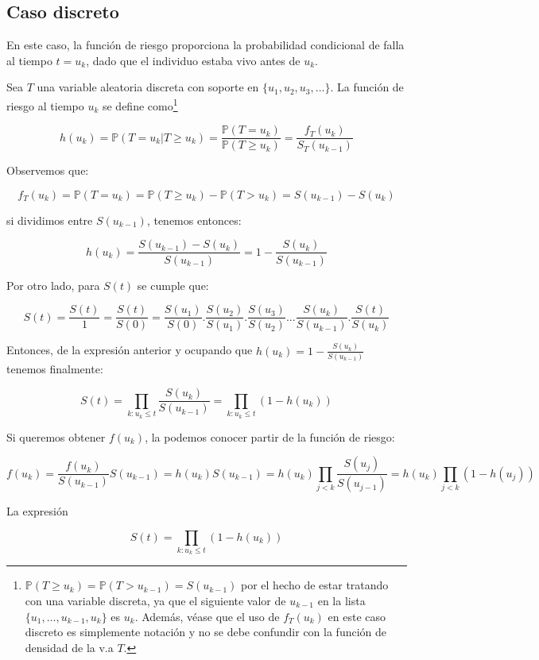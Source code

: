 \documentclass[
  a4paper,
  oneside,
  openany]{book}
\begin{document}
\hypertarget{caso-discreto-1}{%
\subsection*{Caso discreto}\label{caso-discreto-1}}


En este caso, la función de riesgo proporciona la probabilidad condicional de falla al tiempo \(t=u_k\), dado que el individuo estaba vivo antes de \(u_k\).

Sea \(T\) una variable aleatoria discreta con soporte en \(\{u_1,u_2,u_3,...\}\). La función de riesgo al tiempo \(u_k\) se define como\footnote{\(\mathbb{P}(T\geq u_k) = \mathbb{P}(T>u_{k-1}) = S(u_{k-1})\) por el hecho de estar tratando con una variable discreta, ya que el siguiente valor de \(u_{k-1}\) en la lista \(\{u_1, \dots, u_{k-1}, u_{k}\}\) es \(u_k\). Además, véase que el uso de \(f_T(u_k)\) en este caso discreto es simplemente notación y no se debe confundir con la función de densidad de la v.a \(T\).}

\[
h(u_k)=\mathbb{P}(T=u_k|T\geq u_k)=\frac{\mathbb{P}(T=u_k)}{\mathbb{P}(T\geq u_k)} =\frac{f_T(u_k)}{S_T(u_{k-1})}
\]

Observemos que:

\[
f_T(u_k)=\mathbb{P}(T=u_k)=\mathbb{P}(T\geq u_k)-\mathbb{P}(T> u_{k})= S(u_{k-1})-S(u_{k})
\]

si dividimos entre \(S(u_{k-1})\), tenemos entonces:

\[
h(u_k)=\frac{S(u_{k-1})-S(u_{k})}{S(u_{k-1})}=1-\frac{S(u_{k})}{S(u_{k-1})}
\]

Por otro lado, para \(S(t)\) se cumple que:

\[
S(t)=\frac{S(t)}{1}=\frac{S(t)}{S(0)}=\frac{S(u_1)}{S(0)}.\frac{S(u_2)}{S(u_1)}.\frac{S(u_3)}{S(u_2)}...\frac{S(u_k)}{S(u_{k-1})}.\frac{S(t)}{S(u_k)}
\]

Entonces, de la expresión anterior y ocupando que \(h(u_k)=1-\frac{S(u_{k})}{S(u_{k-1})}\) tenemos finalmente:

\[
S(t)=\prod_{k: u_k \leq t}\frac{S(u_k)}{S(u_{k-1})} =\prod_{k: u_k \leq t}(1-h(u_k))
\]

Si queremos obtener \(f(u_k)\), la podemos conocer partir de la función de riesgo:

\[
f(u_k)=\frac{f(u_k)}{S(u_{k-1})}S(u_{k-1})=h(u_k)S(u_{k-1})=h(u_k) \prod_{j<k} \frac{S(u_j)}{S(u_{j-1})}=h(u_k) \prod_{j<k}(1-h(u_j))
\]

La expresión

\[
S(t)=\prod_{k: u_k \leq t}(1-h(u_k))
\]
\end{document}
